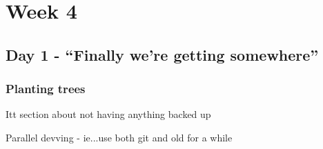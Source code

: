 \cleardoublepage
\chapter{Week 4}
\section{Day 1 - ``Finally we're getting somewhere''}
\subsection{Planting trees}
Itt section about not having anything backed up

Parallel devving - ie...use both git and old for a while

